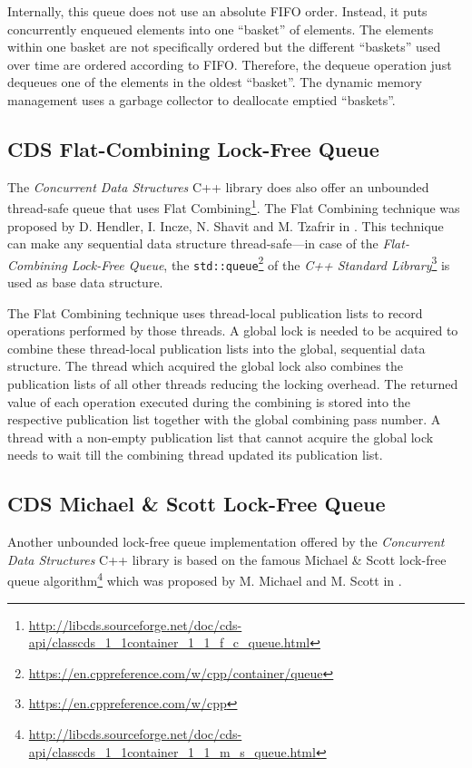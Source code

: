 	Internally, this queue does not use an absolute FIFO order. Instead, it puts concurrently enqueued elements into one ``basket'' of elements. The elements within one basket are not specifically ordered but the different ``baskets'' used over time are ordered according to FIFO. Therefore, the dequeue operation just dequeues one of the elements in the oldest ``basket''. The dynamic memory management uses a garbage collector to deallocate emptied ``baskets''.

\subsection[CDS FCQueue]{CDS Flat-Combining Lock-Free Queue} \label{subsec:cds-fc}

	The \textit{Concurrent Data Structures} C++ library does also offer an unbounded thread-safe queue that uses Flat Combining\footnote{\url{http://libcds.sourceforge.net/doc/cds-api/classcds\_1\_1container\_1\_1\_f\_c\_queue.html}}. The Flat Combining technique was proposed by D. Hendler, I. Incze, N. Shavit and M. Tzafrir in \cite{Hendler:2010}.  This technique can make any sequential data structure thread-safe---in case of the \emph{Flat-Combining Lock-Free Queue}, the \lstinline{std::queue}\footnote{\url{https://en.cppreference.com/w/cpp/container/queue}} of the \textit{C++ Standard Library}\footnote{\url{https://en.cppreference.com/w/cpp}} is used as base data structure.
	
	The Flat Combining technique uses thread-local publication lists to record operations performed by those threads. A global lock is needed to be acquired to combine these thread-local publication lists into the global, sequential data structure. The thread which acquired the global lock also combines the publication lists of all other threads reducing the locking overhead. The returned value of each operation executed during the combining is stored into the respective publication list together with the global combining pass number. A thread with a non-empty publication list that cannot acquire the global lock needs to wait till the combining thread updated its publication list.

\subsection[CDS MSQueue]{CDS Michael \& Scott Lock-Free Queue} \label{subsec:cds-ms}

	Another unbounded lock-free queue implementation offered by the \textit{Concurrent Data Structures} C++ library is based on the famous Michael \& Scott lock-free queue algorithm\footnote{\url{http://libcds.sourceforge.net/doc/cds-api/classcds\_1\_1container\_1\_1\_m\_s\_queue.html}} which was proposed by M. Michael and M. Scott in \cite{Michael:1996}.
	
